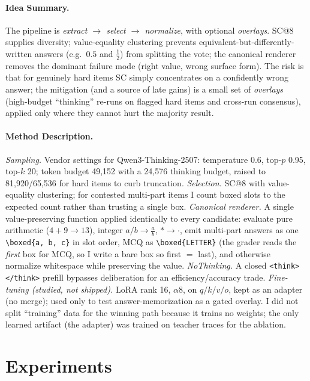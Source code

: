 \documentclass{article}
\newcommand{\new}[1]{#1}
\begin{document}
\paragraph{Idea Summary.}
The pipeline is \emph{extract $\to$ select $\to$ normalize}, with optional
\emph{overlays}. SC@8 supplies diversity; value-equality clustering prevents
equivalent-but-differently-written answers (e.g.\ $0.5$ and $\tfrac12$) from splitting
the vote; the canonical renderer removes the dominant failure mode (right value,
wrong surface form). The risk is that for genuinely hard items SC simply concentrates
on a confidently wrong answer; the mitigation (and a source of late gains) is a small
set of \emph{overlays} (high-budget ``thinking'' re-runs on flagged hard items and
cross-run consensus), applied only where they cannot hurt the majority result.

\new{
\paragraph{Method Description.}
\emph{Sampling.} Vendor settings for Qwen3-Thinking-2507: temperature 0.6, top-$p$
0.95, top-$k$ 20; token budget 49{,}152 with a 24{,}576 thinking budget, raised to
81{,}920/65{,}536 for hard items to curb truncation. \emph{Selection.} SC@8 with
value-equality clustering; for contested multi-part items I count boxed slots to the
expected count rather than trusting a single box. \emph{Canonical renderer.} A single
value-preserving function applied identically to every candidate: evaluate pure
arithmetic ($4{+}9\!\to\!13$), integer $a/b \to \frac{a}{b}$, $\ast\to\cdot$,
emit multi-part answers as one \texttt{\textbackslash boxed\{a, b, c\}} in slot order,
MCQ as \texttt{\textbackslash boxed\{LETTER\}} (the grader reads the \emph{first} box
for MCQ, so I write a bare box so first $=$ last), and otherwise normalize whitespace
while preserving the value. \emph{NoThinking.} A closed \texttt{<think></think>}
prefill bypasses deliberation for an efficiency/accuracy trade. \emph{Fine-tuning
(studied, not shipped).} LoRA rank 16, $\alpha 8$, on $q/k/v/o$, kept as an adapter
(no merge); used only to test answer-memorization as a gated overlay. I did not split
``training'' data for the winning path because it trains no weights; the only learned
artifact (the adapter) was trained on teacher traces for the ablation.
}

\section{Experiments}
\label{sec:experiments}
\end{document}
